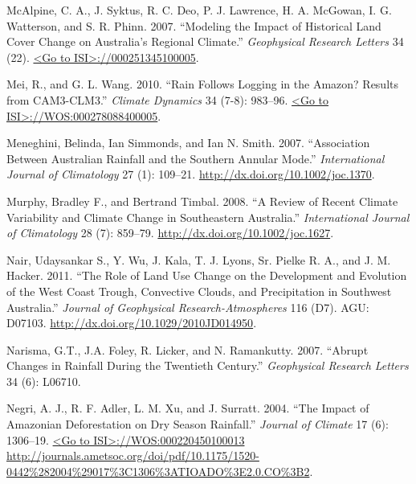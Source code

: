 \documentclass[]{elsarticle} %
\theoremstyle{definition}
\theoremstyle{definition}
\theoremstyle{definition}
\theoremstyle{remark}
\begin{document}
\hypertarget{ref-McAlpine2007}{}
McAlpine, C. A., J. Syktus, R. C. Deo, P. J. Lawrence, H. A. McGowan, I.
G. Watterson, and S. R. Phinn. 2007. ``Modeling the Impact of Historical
Land Cover Change on Australia's Regional Climate.'' \emph{Geophysical
Research Letters} 34 (22).
\href{\%3CGo\%20to\%20ISI\%3E://000251345100005}{\textless{}Go to ISI\textgreater{}://000251345100005}.

\hypertarget{ref-Mei2010}{}
Mei, R., and G. L. Wang. 2010. ``Rain Follows Logging in the Amazon?
Results from CAM3-CLM3.'' \emph{Climate Dynamics} 34 (7-8): 983--96.
\href{\%3CGo\%20to\%20ISI\%3E://WOS:000278088400005}{\textless{}Go to ISI\textgreater{}://WOS:000278088400005}.

\hypertarget{ref-Meneghini2007}{}
Meneghini, Belinda, Ian Simmonds, and Ian N. Smith. 2007. ``Association
Between Australian Rainfall and the Southern Annular Mode.''
\emph{International Journal of Climatology} 27 (1): 109--21.
\url{http://dx.doi.org/10.1002/joc.1370}.

\hypertarget{ref-Murphy2008}{}
Murphy, Bradley F., and Bertrand Timbal. 2008. ``A Review of Recent
Climate Variability and Climate Change in Southeastern Australia.''
\emph{International Journal of Climatology} 28 (7): 859--79.
\url{http://dx.doi.org/10.1002/joc.1627}.

\hypertarget{ref-Nair2011}{}
Nair, Udaysankar S., Y. Wu, J. Kala, T. J. Lyons, Sr. Pielke R. A., and
J. M. Hacker. 2011. ``The Role of Land Use Change on the Development and
Evolution of the West Coast Trough, Convective Clouds, and Precipitation
in Southwest Australia.'' \emph{Journal of Geophysical
Research-Atmospheres} 116 (D7). AGU: D07103.
\url{http://dx.doi.org/10.1029/2010JD014950}.

\hypertarget{ref-Narisma2007}{}
Narisma, G.T., J.A. Foley, R. Licker, and N. Ramankutty. 2007. ``Abrupt
Changes in Rainfall During the Twentieth Century.'' \emph{Geophysical
Research Letters} 34 (6): L06710.

\hypertarget{ref-Negri2004}{}
Negri, A. J., R. F. Adler, L. M. Xu, and J. Surratt. 2004. ``The Impact
of Amazonian Deforestation on Dry Season Rainfall.'' \emph{Journal of
Climate} 17 (6): 1306--19.
\href{\%3CGo\%20to\%20ISI\%3E://WOS:000220450100013\%20http://journals.ametsoc.org/doi/pdf/10.1175/1520-0442\%282004\%29017\%3C1306\%3ATIOADO\%3E2.0.CO\%3B2}{\textless{}Go to ISI\textgreater{}://WOS:000220450100013 http://journals.ametsoc.org/doi/pdf/10.1175/1520-0442\%282004\%29017\%3C1306\%3ATIOADO\%3E2.0.CO\%3B2}.
\end{document}

